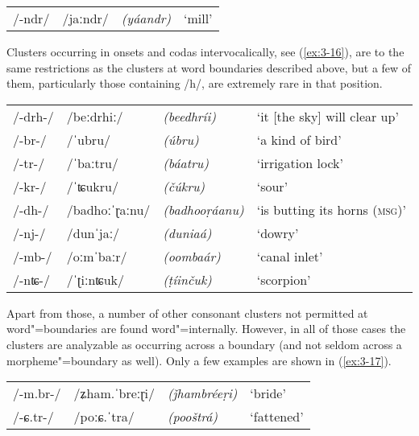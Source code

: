 \begin{exe}
\extab
\label{ex:3-15}
\begin{tabular}{ l l l l }
/-ndr/ &
/jaːndr/ &
\textit{(yáandr)} &
`mill'\\
\end{tabular}
\end{exe}


Clusters occurring in  onsets and  codas intervocalically, see (\ref{ex:3-16}), are  to the same restrictions as the clusters at word boundaries described above, but a few of them, particularly those containing /h/, are extremely rare in that position. 


\begin{exe}
\extab
\label{ex:3-16}
\begin{tabular}{ l l l l }
/-drh-/ &
/beːdrhiː/ &
\textit{(beedhríi)} &
`it [the sky] will clear up'\\
/-br-/ &
/ˈubru/ &
\textit{(úbru)} &
`a kind of bird'\\
/-tr-/ &
/ˈbaːtru/ &
\textit{(báatru)} &
`irrigation lock'\\
/-kr-/ &
/ˈʨukru/ &
\textit{(čúkru)} &
`sour'\\
/-dh-/ &
/badhoːˈɽaːnu/ &
\textit{(badhooṛáanu)} &
`is butting its horns (\textsc{msg)}'\\
/-nj-/ &
/dunˈjaː/ &
\textit{(duniaá)} &
`dowry'\\
/-mb-/ &
/oːmˈbaːr/ &
\textit{(oombaár)} &
`canal inlet'\\
/-nʨ-/ &
/ˈʈiːnʨuk/ &
\textit{(ṭíinčuk)} &
`scorpion'\\
\end{tabular}
\end{exe}


Apart from those, a number of other consonant clusters not permitted at word"=boundaries are found word"=internally. However, in all of those cases the clusters are analyzable as occurring across a  boundary (and not seldom across a morpheme"=boundary as well). Only a few examples are shown in (\ref{ex:3-17}).


\begin{exe}
\extab
\label{ex:3-17}
\begin{tabular}{ l l l l }
/-m.br-/ &
/ʑham.ˈbreːɽi/ &
\textit{(ǰhambréeṛi)} &
`bride'\\
/-ɕ.tr-/ &
/poːɕ.ˈtra/ &
\textit{(pooštrá)} &
`fattened'\\

\end{tabular}
\end{exe}


